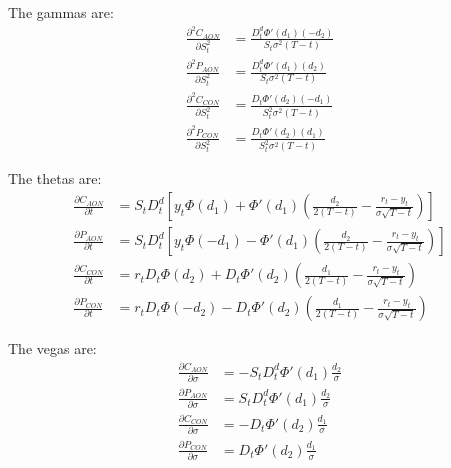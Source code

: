 The gammas are:
\begin{align}
	\frac{\partial^2 C_{AON}}{\partial S_t^2}  
	  &= \frac{D_t^d \Phi'(d_1) (-d_2)}{S_t\sigma^2 (T-t)}  \\
	\frac{\partial^2 P_{AON}}{\partial S_t^2}  
    &= \frac{D_t^d \Phi'(d_1) (d_2)}{S_t\sigma^2 (T-t)}  \\
	\frac{\partial^2 C_{CON}}{\partial S_t^2}  
    &= \frac{D_t \Phi'(d_2) (-d_1)}{S_t^2 \sigma^2(T-t)}  \\
	\frac{\partial^2 P_{CON}}{\partial S_t^2}  
    &= \frac{D_t \Phi'(d_2) (d_1)}{S_t^2 \sigma^2(T-t)}  
\end{align}

The thetas are:
\begin{align}
	\frac{\partial C_{AON}}{\partial t} &= S_t D_t^d 
    \left[ y_t \Phi(d_1) + \Phi'(d_1) 
      \left( \frac{d_2}{2(T-t)} - \frac{r_t-y_t}{\sigma\sqrt{T-t}} \right) 
    \right]  \\
	\frac{\partial P_{AON}}{\partial t} &= S_t D_t^d 
    \left[ y_t \Phi(-d_1) - \Phi'(d_1) 
      \left( \frac{d_2}{2(T-t)} - \frac{r_t-y_t}{\sigma\sqrt{T-t}} \right) 
    \right]  \\
	\frac{\partial C_{CON}}{\partial t}  
  	&= r_t D_t \Phi(d_2) + D_t \Phi'(d_2) 
   	\left( \frac{d_1}{2(T-t)} - \frac{r_t-y_t}{\sigma\sqrt{T-t}} \right)  \\
	\frac{\partial P_{CON}}{\partial t}  
  	&= r_t D_t \Phi(-d_2) - D_t \Phi'(d_2) 
   	\left( \frac{d_1}{2(T-t)} - \frac{r_t-y_t}{\sigma\sqrt{T-t}} \right)  
\end{align}

The vegas are:
\begin{align}
	\frac{\partial C_{AON}}{\partial \sigma}  
  	&= - S_t D_t^d \Phi'(d_1) \frac{d_2}{\sigma}   \\
	\frac{\partial P_{AON}}{\partial \sigma}  
  	&= S_t D_t^d \Phi'(d_1) \frac{d_2}{\sigma}   \\
	\frac{\partial C_{CON}}{\partial \sigma}  
  	&= - D_t \Phi'(d_2) \frac{d_1}{\sigma}   \\
	\frac{\partial P_{CON}}{\partial \sigma}  
  	&= D_t \Phi'(d_2) \frac{d_1}{\sigma}   
\end{align}

